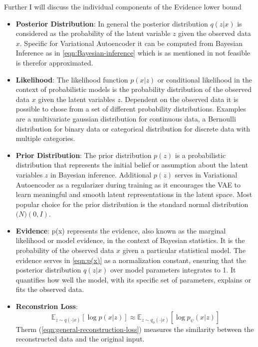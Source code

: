 Further I will discuss the individual components of the Evidence lower bound 
\begin{itemize}
	\item \textbf{Posterior Distribution}: In general the posterior distribution $q(z|x)$ is considered as the probability of the latent variable $z$ given the observed data $x$. Specific for Variational Autoencoder it can be computed from Bayesian Inference as in \eqref{eqn:Bayesian-inference} which is as mentioned in  not feasible is therefor approximated.
	\item \textbf{Likelihood}: The likelihood function $p(x|z)$ or conditional likelihood in the context of probabilistic models is the probability distribution of the observed data $x$ given the latent variables $z$. Dependent on the observed data it is possible to chose from a set of different probability distributions. Examples are a multivariate gaussian distribution for continuous data, a Bernoulli distribution for binary data or categorical distribution for discrete data with multiple categories.
	\item \textbf{Prior Distribution}: The prior distribution $p(z)$ is a probabilistic distribution that represents the initial belief or assumption about the latent variables $z$ in Bayesian inference. Additional $p(z)$ serves in Variational Autoencoder as a regularizer during training as it encourages the VAE to learn meaningful and smooth latent representations in the latent space. Most popular choice for the prior distribution is the standard normal distribution $\mathcal(N)(0, I)$.  
	\item \textbf{Evidence}: p(x) represents the evidence, also known as the marginal likelihood or model evidence, in the context of Bayesian statistics. It is the probability of the observed data $x$ given a particular statistical model. The evidence serves in \eqref{eqn:p(x)} as a normalization constant, ensuring that the posterior distribution $q(z|x)$ over model parameters integrates to 1. It quantifies how well the model, with its specific set of parameters, explains or fits the observed data.
	\item \textbf{Reconstrion Loss}: 
	\begin{equation}\label{eqn:general-reconstruction-loss}
		\mathbb{E}_{z\sim q(\cdot|x)} \left[ \log p(x|z) \right] \approx \mathbb{E}_{z\sim q_\phi(\cdot|x)} \left[ \log p_\psi(x|z) \right]
	\end{equation}
	Therm (\ref{eqn:general-reconstruction-loss}) measures the similarity between the reconstructed data and the original input. 

\end{itemize}

